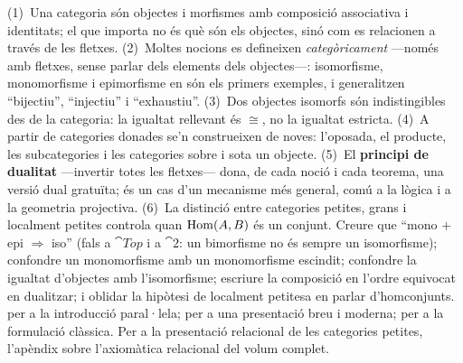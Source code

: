 \begin{resumcap}
 (1)~Una categoria són objectes i morfismes amb composició associativa i identitats; el que importa no és què són els objectes, sinó com es relacionen a través de les fletxes. (2)~Moltes nocions es defineixen \emph{categòricament} ---només amb fletxes, sense parlar dels elements dels objectes---: isomorfisme, monomorfisme i epimorfisme en són els primers exemples, i generalitzen \enquote{bijectiu}, \enquote{injectiu} i \enquote{exhaustiu}. (3)~Dos objectes isomorfs són indistingibles des de la categoria: la igualtat rellevant és $\cong$, no la igualtat estricta. (4)~A partir de categories donades se'n construeixen de noves: l'oposada, el producte, les subcategories i les categories sobre i sota un objecte. (5)~El \textbf{principi de dualitat} ---invertir totes les fletxes--- dona, de cada noció i cada teorema, una versió dual gratuïta; és un cas d'un mecanisme més general, comú a la lògica i a la geometria projectiva. (6)~La distinció entre categories petites, grans i localment petites controla quan $\operatorname{Hom}(A,B)$ és un conjunt.
 Creure que \enquote{mono $+$ epi $\Rightarrow$ iso} (fals a $\cat{Top}$ i a $\cat{2}$: un bimorfisme no és sempre un isomorfisme); confondre un monomorfisme amb un monomorfisme escindit; confondre la igualtat d'objectes amb l'isomorfisme; escriure la composició en l'ordre equivocat en dualitzar; i oblidar la hipòtesi de localment petitesa en parlar d'homconjunts.
 \cite[cap.~1]{awodey} per a la introducció paral·lela; \cite[cap.~1]{leinster} per a una presentació breu i moderna; \cite[I]{maclane} per a la formulació clàssica. Per a la presentació relacional de les categories petites, l'apèndix sobre l’axiomàtica relacional del volum complet.
\end{resumcap}